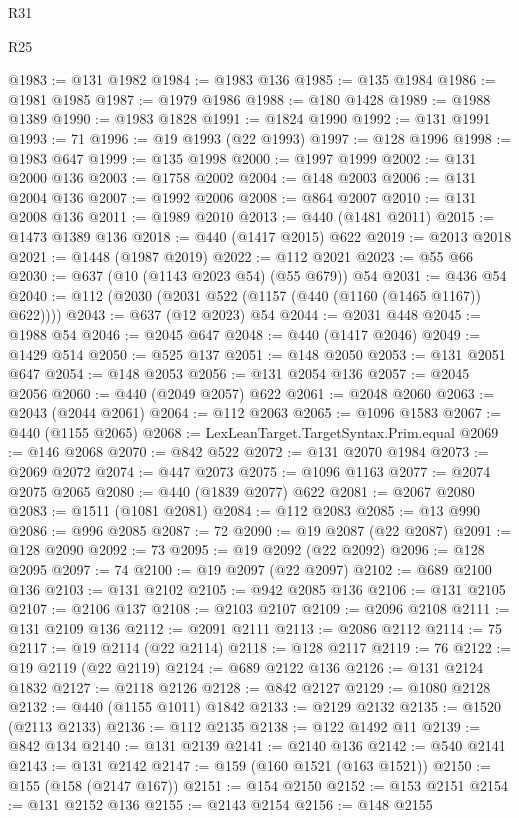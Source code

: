 \begin{lexlean}{R31}
\begin{lexlean}{R25}
\begin{coremodule}
{{{{{{{{{{{{{{{{{{{{{{{{{{{{{{{{{{{{{{{{{{{{{{{{{{{{{{{{{{{{{{{{{{{{{{{{{{{{{{{{{{{{{{{{{{{{{{{{{{{{{{{{{{{{{{{{{{{{{{{{{{{{{{{{{{{{{{{{{{{{{{{{{{{{{{{{{{{{{{{{{{{{{{{{{{{{{{{{{{{{{{{{{{{{{{{{{{{{{{{@1983 := @131 @1982
@1984 := @1983 @136
@1985 := @135 @1984
@1986 := @1981 @1985
@1987 := @1979 @1986
@1988 := @180 @1428
@1989 := @1988 @1389
@1990 := @1983 @1828
@1991 := @1824 @1990
@1992 := @131 @1991
@1993 := 71
@1996 := @19 @1993 (@22 @1993)
@1997 := @128 @1996
@1998 := @1983 @647
@1999 := @135 @1998
@2000 := @1997 @1999
@2002 := @131 @2000 @136
@2003 := @1758 @2002
@2004 := @148 @2003
@2006 := @131 @2004 @136
@2007 := @1992 @2006
@2008 := @864 @2007
@2010 := @131 @2008 @136
@2011 := @1989 @2010
@2013 := @440 (@1481 @2011)
@2015 := @1473 @1389 @136
@2018 := @440 (@1417 @2015) @622
@2019 := @2013 @2018
@2021 := @1448 (@1987 @2019)
@2022 := @112 @2021
@2023 := @55 @66
@2030 := @637 (@10 (@1143 @2023 @54) (@55 @679)) @54
@2031 := @436 @54
@2040 := @112 (@2030 (@2031 @522 (@1157 (@440 (@1160 (@1465 @1167)) @622))))
@2043 := @637 (@12 @2023) @54
@2044 := @2031 @448
@2045 := @1988 @54
@2046 := @2045 @647
@2048 := @440 (@1417 @2046)
@2049 := @1429 @514
@2050 := @525 @137
@2051 := @148 @2050
@2053 := @131 @2051 @647
@2054 := @148 @2053
@2056 := @131 @2054 @136
@2057 := @2045 @2056
@2060 := @440 (@2049 @2057) @622
@2061 := @2048 @2060
@2063 := @2043 (@2044 @2061)
@2064 := @112 @2063
@2065 := @1096 @1583
@2067 := @440 (@1155 @2065)
@2068 := LexLeanTarget.TargetSyntax.Prim.equal
@2069 := @146 @2068
@2070 := @842 @522
@2072 := @131 @2070 @1984
@2073 := @2069 @2072
@2074 := @447 @2073
@2075 := @1096 @1163
@2077 := @2074 @2075 @2065
@2080 := @440 (@1839 @2077) @622
@2081 := @2067 @2080
@2083 := @1511 (@1081 @2081)
@2084 := @112 @2083
@2085 := @13 @990
@2086 := @996 @2085
@2087 := 72
@2090 := @19 @2087 (@22 @2087)
@2091 := @128 @2090
@2092 := 73
@2095 := @19 @2092 (@22 @2092)
@2096 := @128 @2095
@2097 := 74
@2100 := @19 @2097 (@22 @2097)
@2102 := @689 @2100 @136
@2103 := @131 @2102
@2105 := @942 @2085 @136
@2106 := @131 @2105
@2107 := @2106 @137
@2108 := @2103 @2107
@2109 := @2096 @2108
@2111 := @131 @2109 @136
@2112 := @2091 @2111
@2113 := @2086 @2112
@2114 := 75
@2117 := @19 @2114 (@22 @2114)
@2118 := @128 @2117
@2119 := 76
@2122 := @19 @2119 (@22 @2119)
@2124 := @689 @2122 @136
@2126 := @131 @2124 @1832
@2127 := @2118 @2126
@2128 := @842 @2127
@2129 := @1080 @2128
@2132 := @440 (@1155 @1011) @1842
@2133 := @2129 @2132
@2135 := @1520 (@2113 @2133)
@2136 := @112 @2135
@2138 := @122 @1492 @11
@2139 := @842 @134
@2140 := @131 @2139
@2141 := @2140 @136
@2142 := @540 @2141
@2143 := @131 @2142
@2147 := @159 (@160 @1521 (@163 @1521))
@2150 := @155 (@158 (@2147 @167))
@2151 := @154 @2150
@2152 := @153 @2151
@2154 := @131 @2152 @136
@2155 := @2143 @2154
@2156 := @148 @2155
}}}}}}}}}}}}}}}}}}}}}}}}}}}}}}}}}}}}}}}}}}}}}}}}}}}}}}}}}}}}}}}}}}}}}}}}}}}}}}}}}}}}}}}}}}}}}}}}}}}}}}}}}}}}}}}}}}}}}}}}}}}}}}}}}}}}}}}}}}}}}}}}}}}}}}}}}}}}}}}}}}}}}}}}}}}}}}}}}}}}}}}}}}}}}}}}}}}}}}}
\end{coremodule}
\end{lexlean}
\end{lexlean}
